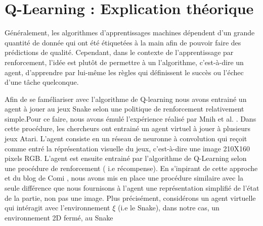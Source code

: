 \documentclass{article}
\begin{document}
\section{Q-Learning : Explication théorique  }
Généralement, les algorithmes d’apprentissages machines dépendent d’un grande quantité de donnée qui ont été étiquetées à la main afin de pouvoir faire des prédictions de qualité. Cependant, dans le contexte de l'apprentissage par renforcement, l’idée est plutôt de permettre à un l’algorithme, c’est-à-dire un agent, d’apprendre par lui-même les règles qui définissent le succès ou l’échec d’une tâche quelconque.\linebreak

Afin de se faméliariser avec l'algorithme de Q-learning nous avons entrainé un agent à jouer au jeux Snake selon  une politique de renforcement relativement simple.Pour ce faire, nous avons émulé l'expérience réalisé par Mnih et al. \cite{DBLP:journals/corr/MnihKSGAWR13}. Dans cette procédure, les chercheurs ont entrainé un agent virtuel à jouer à plusieurs jeux Atari. L'agent consiste en un réseau de neuronne à convolution qui reçoit comme entré la réprésentation visuelle du jeux, c'est-à-dire une image 210X160 pixels RGB. L'agent est ensuite entrainé par l'algorithme de Q-Learning selon une procédure de renforcement ( i.e récompense). En s'inpirant de cette approche et du blog de Comi \cite{comi_2020}, nous avons mis en place une procédure similaire avec la seule différence que nous fournisons à l'agent une représentation simplifié de l'état de la partie, non pas une image.  Plus précisément, considérons un agent virtuelle qui intéragit avec l'environnement $\xi$ (i.e le Snake), dans notre cas, un environnement 2D fermé, au Snake
\end{document}
